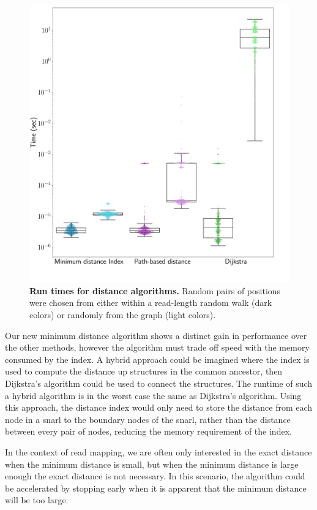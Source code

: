\documentclass[11pt]{ucscthesis}
\begin{document}
\begin{figure}[H]
    \centering
    \includegraphics[width=0.7\columnwidth]{aim1_distance_times.png}
    \caption[Run times for distance algorithms]{\textbf{Run times for distance algorithms.}  Random pairs of positions were chosen from either within a read-length random walk (dark colors) or randomly from the graph (light colors).}
    \label{fig:aim1_distance_times}
\end{figure}

Our new minimum distance algorithm shows a distinct gain in performance over the other methods, however the algorithm must trade off speed with the memory consumed by the index.
A hybrid approach could be imagined where the index is used to compute the distance up structures in the common ancestor, then Dijkstra's algorithm could be used to connect the structures.
The runtime of such a hybrid algorithm is in the worst case the same as Dijkstra's algorithm.
Using this approach, the distance index would only need to store the distance from each node in a snarl to the boundary nodes of the snarl, rather than the distance between every pair of nodes, reducing the memory requirement of the index.

In the context of read mapping, we are often only interested in the exact distance when the minimum distance is small, but when the minimum distance is large enough the exact distance is not necessary.
In this scenario, the algorithm could be accelerated by stopping early when it is apparent that the minimum distance will be too large.
\end{document}

